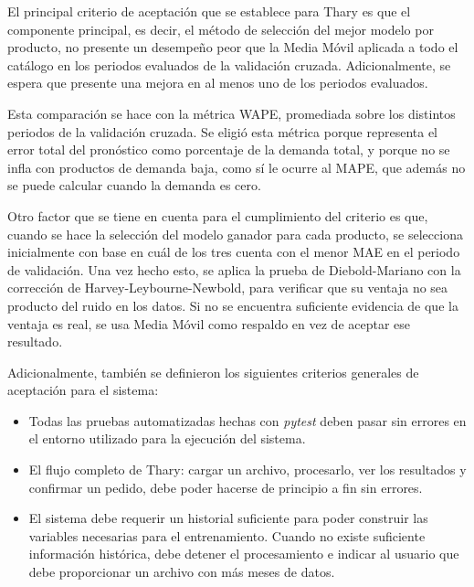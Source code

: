 El principal criterio de aceptación que se establece para Thary es que el componente principal, es decir, el método de selección del mejor modelo por producto, no presente un desempeño peor que la Media Móvil aplicada a todo el catálogo en los periodos evaluados de la validación cruzada. Adicionalmente, se espera que presente una mejora en al menos uno de los periodos evaluados.

Esta comparación se hace con la métrica WAPE, promediada sobre los distintos periodos de la validación cruzada. Se eligió esta métrica porque representa el error total del pronóstico como porcentaje de la demanda total, y porque no se infla con productos de demanda baja, como sí le ocurre al MAPE, que además no se puede calcular cuando la demanda es cero.

Otro factor que se tiene en cuenta para el cumplimiento del criterio es que, cuando se hace la selección del modelo ganador para cada producto, se selecciona inicialmente con base en cuál de los tres cuenta con el menor MAE en el periodo de validación. Una vez hecho esto, se aplica la prueba de Diebold-Mariano con la corrección de Harvey-Leybourne-Newbold, para verificar que su ventaja no sea producto del ruido en los datos. Si no se encuentra suficiente evidencia de que la ventaja es real, se usa Media Móvil como respaldo en vez de aceptar ese resultado.

Adicionalmente, también se definieron los siguientes criterios generales de aceptación para el sistema:

\begin{itemize}
    \item Todas las pruebas automatizadas hechas con \textit{pytest} deben pasar sin errores en el entorno utilizado para la ejecución del sistema.
    \item El flujo completo de Thary: cargar un archivo, procesarlo, ver los resultados y confirmar un pedido, debe poder hacerse de principio a fin sin errores.
    \item El sistema debe requerir un historial suficiente para poder construir las variables necesarias para el entrenamiento. Cuando no existe suficiente información histórica, debe detener el procesamiento e indicar al usuario que debe proporcionar un archivo con más meses de datos.
\end{itemize}